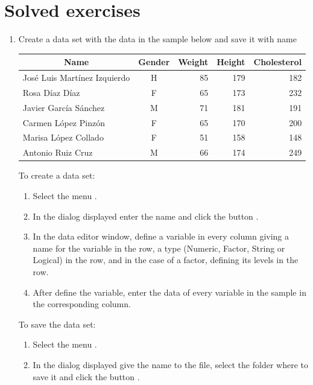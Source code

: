 \section{Solved exercises}
\begin{enumerate}[leftmargin=*]
\item Create a data set with the data in the sample below and save it with name 
\begin{center}
\begin{tabular}{|l|c|r|r|r|}
\hline
\multicolumn{1}{|c|}{Name} & \multicolumn{1}{c|}{Gender} & \multicolumn{1}{c|}{Weight} & \multicolumn{1}{c|}{Height} &
\multicolumn{1}{c|}{Cholesterol}\\
\hline
José Luis Martínez Izquierdo  & H &  85 & 179 & 182\\
Rosa Díaz Díaz & F & 65 & 173 & 232\\
Javier García Sánchez  & M & 71 & 181 & 191\\
Carmen López Pinzón & F &  65 & 170 & 200\\
Marisa López Collado & F &  51 & 158 & 148\\
Antonio Ruiz Cruz & M & 66 & 174 & 249\\
\hline
\end{tabular}
\end{center}

\begin{indication}
To create a data set:
\begin{enumerate}
\item Select the menu .
\item In the dialog displayed enter the name  and click the button .
\item In the data editor window, define a variable in every column giving a name for the variable in the 
row, a type (Numeric, Factor, String or Logical) in the  row, and in the case of a factor, defining its
levels in the  row.
\item After define the variable, enter the data of every variable in the sample in the corresponding column.
\end{enumerate}
To save the data set:
\begin{enumerate}
\item Select the menu .
\item In the dialog displayed give the name  to the file, select the folder where to save it
and click the button .
\end{enumerate}
\end{indication}


\end{enumerate}
